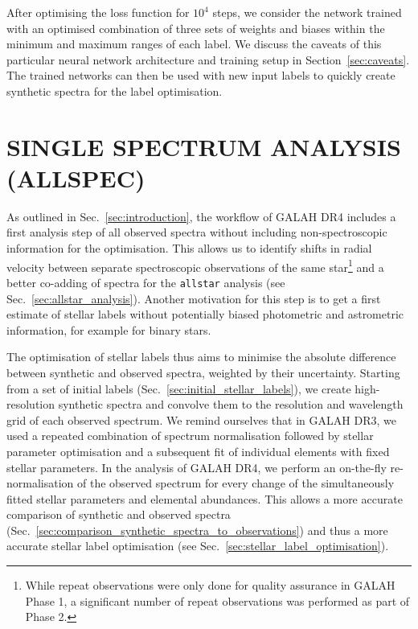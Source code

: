 \documentclass[
  journal=pasa,
  manuscript=research-paper, %
  year=2024,
  volume=37
]{cup-journal}
\begin{document}
After optimising the loss function for $10^4$ steps, we consider the network trained with an optimised combination of three sets of weights and biases within the minimum and maximum ranges of each label. We discuss the caveats of this particular neural network architecture and training setup in Section~\ref{sec:caveats}. The trained networks can then be used with new input labels to quickly create synthetic spectra for the label optimisation.

\section{SINGLE SPECTRUM ANALYSIS (ALLSPEC)}
\label{sec:allspec_analysis}

As outlined in Sec.~\ref{sec:introduction}, the workflow of GALAH DR4 includes a first analysis step of all observed spectra without including non-spectroscopic information for the optimisation. This allows us to identify shifts in radial velocity between separate spectroscopic observations of the same star\footnote{While repeat observations were only done for quality assurance in GALAH Phase 1, a significant number of repeat observations was performed as part of Phase 2.} and a better co-adding of spectra for the \texttt{allstar} analysis (see Sec.~\ref{sec:allstar_analysis}). Another motivation for this step is to get a first estimate of stellar labels without potentially biased photometric and astrometric information, for example for binary stars.

The optimisation of stellar labels thus aims to minimise the absolute difference between synthetic and observed spectra, weighted by their uncertainty. Starting from a set of initial labels (Sec.~\ref{sec:initial_stellar_labels}), we create high-resolution synthetic spectra and convolve them to the resolution and wavelength grid of each observed spectrum. We remind ourselves that in GALAH DR3, we used a repeated combination of spectrum normalisation followed by stellar parameter optimisation and a subsequent fit of individual elements with fixed stellar parameters. In the analysis of GALAH DR4, we perform an on-the-fly re-normalisation of the observed spectrum for every change of the simultaneously fitted stellar parameters and elemental abundances. This allows a more accurate comparison of synthetic and observed spectra (Sec.~\ref{sec:comparison_synthetic_spectra_to_observations}) and thus a more accurate stellar label optimisation (see Sec.~\ref{sec:stellar_label_optimisation}).
\end{document}
